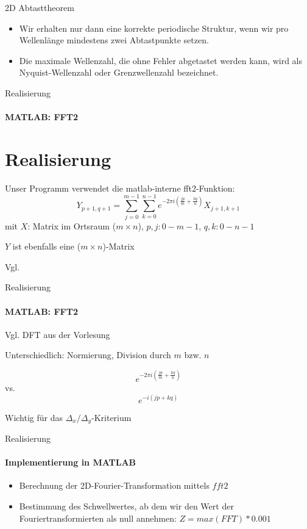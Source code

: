 \documentclass{beamer}
\begin{document}
	\begin{frame}{2D Abtasttheorem}
	\begin{itemize}
		\item Wir erhalten nur dann eine korrekte periodische
		Struktur, wenn wir pro Wellenlänge mindestens zwei Abtastpunkte setzen.
		\item Die maximale Wellenzahl, die ohne Fehler abgetastet werden kann, wird als	Nyquist-Wellenzahl oder Grenzwellenzahl bezeichnet.
	\end{itemize}
	\end{frame}
	
	\begin{frame}{Realisierung}
	\framesubtitle{MATLAB: FFT2}
	\section{Realisierung}	
	Unser Programm verwendet die matlab-interne fft2-Funktion:
	$$Y_{p+1,q+1} = \sum_{j=0}^{m-1}\sum_{k=0}^{n-1}e^{-2\pi i(\frac{jp}{m}+\frac{kq}{n})}X_{j+1,k+1}$$ mit $X$: Matrix im Ortsraum ($m\times n$), $p,j: 0 - m-1$, $q,k: 0 - n-1$

	$Y$ ist ebenfalls eine ($m\times n$)-Matrix
	
	Vgl. \cite{fft2}
	\end{frame}
	\begin{frame}{Realisierung}
	\framesubtitle{MATLAB: FFT2}
	Vgl. DFT aus der Vorlesung
	
	Unterschiedlich: Normierung, Division durch $m$ bzw. $n$
	
	$$ e^{-2\pi i(\frac{jp}{m}+\frac{kq}{n})} $$ vs. 
	$$ e^{-i(jp+kq)} $$
	
	Wichtig für das $\Delta_x / \Delta_y$-Kriterium
	\end{frame}
	
	\begin{frame}{Realisierung}
	\framesubtitle{Implementierung in MATLAB}
	\begin{itemize}
		\item Berechnung der 2D-Fourier-Transformation mittels $fft2$
		\item Bestimmung des \dq Schwellwertes\dq, ab dem wir den Wert der Fouriertransformierten als null annehmen: $Z = max(FFT)*0.001$	
	\end{itemize}

	\end{frame}
\end{document}
